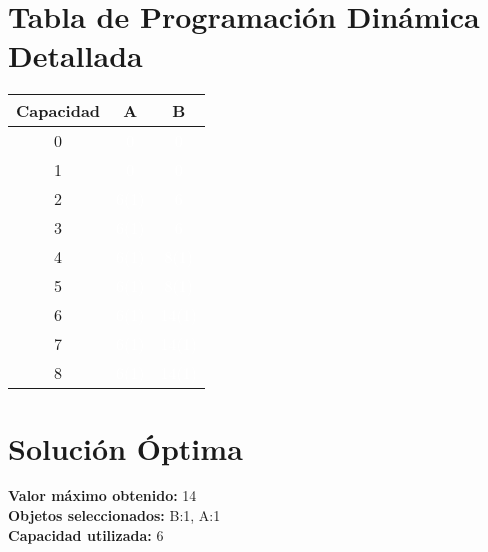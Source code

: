 \documentclass{article}
\begin{document}
\section*{Tabla de Programación Dinámica Detallada}
\begin{center}
\scriptsize
\begin{tabular}{|c|c|c|}
\hline
Capacidad & A & B \\ \hline
0 & \cellcolor{rojo}\textcolor{white}{0} & \cellcolor{rojo}\textcolor{white}{0} \\ \hline
1 & \cellcolor{rojo}\textcolor{white}{0} & \cellcolor{rojo}\textcolor{white}{0} \\ \hline
2 & \cellcolor{verde}\textcolor{white}{6(1)} & \cellcolor{rojo}\textcolor{white}{6} \\ \hline
3 & \cellcolor{verde}\textcolor{white}{6(1)} & \cellcolor{rojo}\textcolor{white}{6} \\ \hline
4 & \cellcolor{verde}\textcolor{white}{6(1)} & \cellcolor{verde}\textcolor{white}{8(1)} \\ \hline
5 & \cellcolor{verde}\textcolor{white}{6(1)} & \cellcolor{verde}\textcolor{white}{8(1)} \\ \hline
6 & \cellcolor{verde}\textcolor{white}{6(1)} & \cellcolor{verde}\textcolor{white}{14(1)} \\ \hline
7 & \cellcolor{verde}\textcolor{white}{6(1)} & \cellcolor{verde}\textcolor{white}{14(1)} \\ \hline
8 & \cellcolor{verde}\textcolor{white}{6(1)} & \cellcolor{verde}\textcolor{white}{14(1)} \\ \hline
\end{tabular}
\end{center}
\normalsize

\section*{Solución Óptima}
\textbf{Valor máximo obtenido:} 14\\
\textbf{Objetos seleccionados:} B:1, A:1\\
\textbf{Capacidad utilizada:} 6\\
\end{document}
